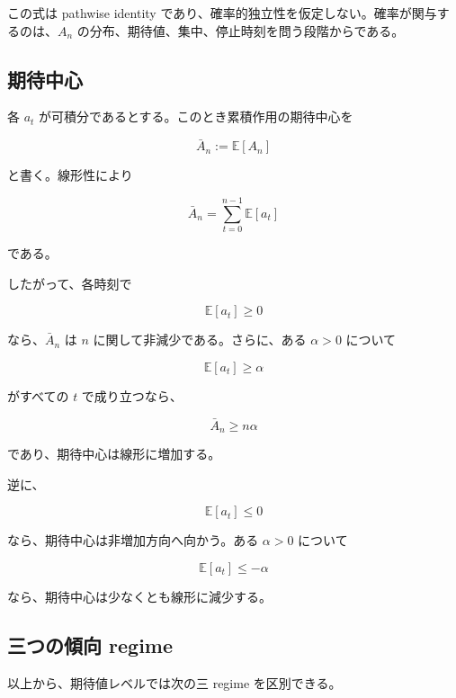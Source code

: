 \documentclass[12pt,a4paper]{article}
\begin{document}
この式は pathwise identity であり、確率的独立性を仮定しない。確率が関与するのは、\(A_{n}\) の分布、期待値、集中、停止時刻を問う段階からである。

\subsection{期待中心}\label{ux671fux5f85ux4e2dux5fc3}

各 \(a_{t}\) が可積分であるとする。このとき累積作用の期待中心を

\[
\bar A_{n} := \mathbb E[A_{n}]
\]

と書く。線形性により

\[
\bar A_{n} = \sum_{t=0}^{n-1} \mathbb E[a_{t}]
\]

である。

したがって、各時刻で

\[
\mathbb E[a_{t}] \ge 0
\]

なら、\(\bar A_{n}\) は \(n\) に関して非減少である。さらに、ある \(\alpha>0\) について

\[
\mathbb E[a_{t}] \ge \alpha
\]

がすべての \(t\) で成り立つなら、

\[
\bar A_{n} \ge n\alpha
\]

であり、期待中心は線形に増加する。

逆に、

\[
\mathbb E[a_{t}] \le 0
\]

なら、期待中心は非増加方向へ向かう。ある \(\alpha>0\) について

\[
\mathbb E[a_{t}] \le -\alpha
\]

なら、期待中心は少なくとも線形に減少する。

\subsection{三つの傾向 regime}\label{ux4e09ux3064ux306eux50beux5411-regime}

以上から、期待値レベルでは次の三 regime を区別できる。
\end{document}
